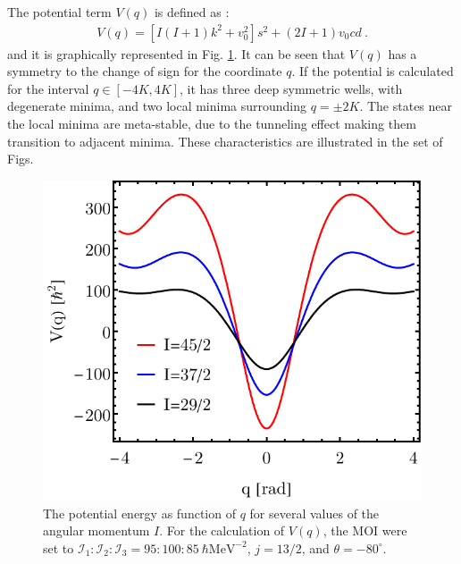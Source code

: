 The potential term $V(q)$ is defined as \cite{raduta2020new}:
\begin{align}
    V(q)=\left[I(I+1)k^2+v_0^2\right]s^2+\left(2I+1\right)v_0cd\ .
    \label{elliptic-potential-formula}
\end{align}
and it is graphically represented in Fig. \ref{elliptic-potential-plot}. It can be seen that $V(q)$ has a symmetry to the change of sign for the coordinate $q$. If the potential is calculated for the interval $q\in\left[-4K,4K\right]$, it has three deep symmetric wells, with degenerate minima, and two local minima surrounding $q=\pm 2K$. The states near the local minima are meta-stable, due to the tunneling effect making them transition to adjacent minima. These characteristics are illustrated in the set of Figs.
\begin{figure}
    \centering
    \includegraphics[scale=0.85]{Chapters/Figures/Elliptic-Potential-V.pdf}
    \caption{The potential energy as function of $q$ for several values of the angular momentum $I$. For the calculation of $V(q)$, the MOI were set to $\mathcal{I}_1:\mathcal{I}_2:\mathcal{I}_3=95:100:85\ \hbar\text{MeV}^{-2}$, $j=13/2$, and $\theta=-80^\circ$.}
    \label{elliptic-potential-plot}
\end{figure}
